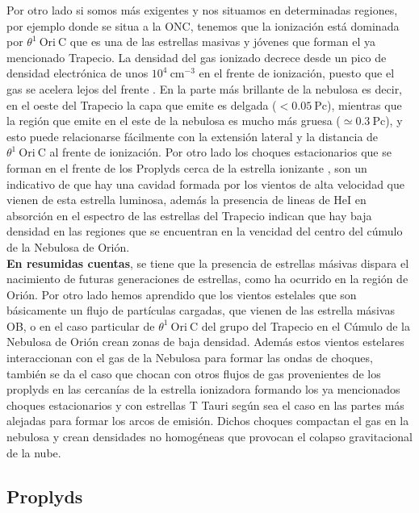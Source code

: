 \documentclass{article}
\begin{document}
Por otro lado si somos más exigentes y nos situamos en determinadas regiones, por ejemplo donde se situa a la ONC, tenemos que la ionización está dominada por  \(\theta^1\ \text{Ori}\ \text{C}\) que es una de las estrellas masivas y jóvenes que forman el ya mencionado Trapecio. La densidad del gas ionizado decrece desde un pico de densidad electrónica de unos  \(10^{4}~\text{cm}^{-3}\) en el frente de ionización, puesto que el gas se acelera lejos del frente \citep{Henney:2005a}. En la parte más brillante de la nebulosa es decir, en el oeste del Trapecio la capa que emite es delgada (\(< 0.05 ~\text{Pc}\)), mientras que la región que emite en el este de la nebulosa es mucho más gruesa (\(\simeq 0.3~\text{Pc}\)), y esto puede relacionarse fácilmente con la extensión lateral y la distancia de  \(\theta^1\ \text{Ori}\ \text{C}\) al frente de ionización. Por otro lado los choques estacionarios que se forman en el frente de los Proplyds cerca de la estrella ionizante \citep{Bally:2000a}, son un indicativo de que hay una cavidad formada por los vientos de alta velocidad que vienen de esta estrella luminosa, además  la presencia de lineas de HeI en absorción en el espectro de las estrellas del Trapecio \citep{ Odell:1993, Baldwin:1991} indican que hay baja densidad en las regiones que se encuentran en la vencidad del centro del cúmulo de la Nebulosa de Orión. \\

\textbf{En resumidas cuentas}, se tiene que la presencia de estrellas másivas dispara el nacimiento de futuras generaciones de estrellas, como ha ocurrido en la región de Orión. Por otro lado hemos aprendido que los vientos estelales que son básicamente un flujo de partículas cargadas, que vienen de las estrella másivas OB, o en el caso particular de \(\theta^1\ \text{Ori}\ \text{C}\) del grupo del Trapecio en el Cúmulo de la Nebulosa de Orión crean zonas de baja densidad. Además estos vientos estelares interaccionan con el gas de la Nebulosa para formar las ondas de choques, también se da el caso que chocan con otros flujos de gas provenientes de los proplyds en las cercanías de la estrella ionizadora formando los ya mencionados choques estacionarios y con estrellas T Tauri según sea el caso en las partes más alejadas para formar los arcos de emisión. Dichos choques compactan el gas en la nebulosa y crean densidades no homogéneas que provocan el colapso gravitacional de la nube.\\

\subsection{Proplyds}
\label{sec:proplyds}
\end{document}
